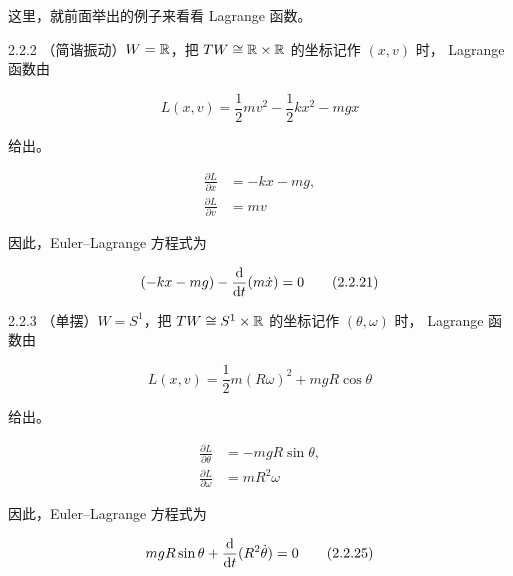 这里，就前面举出的例子来看看 Lagrange 函数。

\begin{example}{2.2.2}
（简谐振动）$W=\mathbb{R}$，把 $TW\cong\mathbb{R}\times\mathbb{R}$ 的坐标记作 $(x,v)$ 时，
Lagrange 函数由

\begin{equation}
  L(x,v) = \frac{1}{2}mv^2 - \frac{1}{2}kx^2 - mgx
  \tag{2.2.18}
\end{equation}

给出。

\begin{align}
  \frac{\partial L}{\partial x} &= -kx - mg, \tag{2.2.19}\\
  \frac{\partial L}{\partial v} &= mv \tag{2.2.20}
\end{align}

因此，Euler--Lagrange 方程式为

\begin{equation}
  (-kx - mg) - \frac{\mathrm{d}}{\mathrm{d} t}(m\dot x) = 0
  \tag{2.2.21}
\end{equation}
\end{example}

\begin{example}{2.2.3}
（单摆）$W=S^1$，把 $TW\cong S^1\times\mathbb{R}$ 的坐标记作 $(\theta,\omega)$ 时，
Lagrange 函数由

\begin{equation}
  L(x,v) = \frac{1}{2}m(R\omega)^2 + mgR\cos\theta
  \tag{2.2.22}
\end{equation}

给出。

\begin{align}
  \frac{\partial L}{\partial\theta} &= -mgR\sin\theta, \tag{2.2.23}\\
  \frac{\partial L}{\partial\omega} &= mR^2\omega \tag{2.2.24}
\end{align}

因此，Euler--Lagrange 方程式为

\begin{equation}
  mgR\sin\theta + \frac{\mathrm{d}}{\mathrm{d} t}(R^2\dot\theta) = 0
  \tag{2.2.25}
\end{equation}

\end{example}

